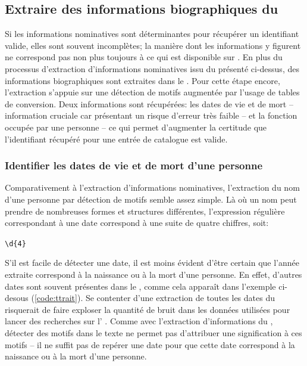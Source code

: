 \subsection{Extraire des informations biographiques du \ttrait{}}
Si les informations nominatives sont déterminantes pour récupérer un identifiant valide, elles sont souvent incomplètes; la manière dont les informations y figurent ne correspond pas non plus toujours à ce qui est disponible sur \wkd{}. En plus du processus d'extraction d'informations nominatives issu du \tname{} présenté ci-dessus, des informations biographiques sont extraites dans le \ttrait{}. Pour cette étape encore, l'extraction s'appuie sur une détection de motifs augmentée par l'usage de tables de conversion. Deux informations sont récupérées: les dates de vie et de mort -- information cruciale car présentant un risque d'erreur très faible -- et la fonction occupée par une personne -- ce qui permet d'augmenter la certitude que l'identifiant \wkd{} récupéré pour une entrée de catalogue est valide.

\subsubsection{Identifier les dates de vie et de mort d'une personne}
Comparativement à l'extraction d'informations nominatives, l'extraction du nom d'une personne par détection de motifs semble assez simple. Là où un nom peut prendre de nombreuses formes et structures différentes, l'\gls{expression régulière} correspondant à une date correspond à une suite de quatre chiffres, soit:

\begin{center}
	\texttt{\textbackslash{}d\{4\}}
\end{center}

S'il est facile de détecter une date, il est moins évident d'être certain que l'année extraite correspond à la naissance ou à la mort d'une personne. En effet, d'autres dates sont souvent présentes dans le \ttrait{}, comme cela apparaît dans l'exemple ci-desous (\ref{code:ttrait}). Se contenter d'une extraction de toutes les dates du \ttrait{} risquerait de faire exploser la quantité de bruit dans les données utilisées pour lancer des recherches sur l'\api{} \wkd{}. Comme avec l'extraction d'informations du \tname{}, détecter des motifs dans le texte ne permet pas d'attribuer une signification à ces motifs -- il ne suffit pas de repérer une date pour que cette date correspond à la naissance ou à la mort d'une personne.

